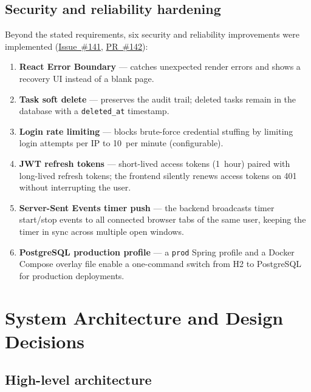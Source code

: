 \documentclass[a4paper, 12pt]{article}
\begin{document}
\subsection{Security and reliability hardening}
\label{sec:hardening-overview}

Beyond the stated requirements, six security and reliability improvements were implemented
(\href{https://github.com/se2p-classrooms/final-project-AliAkbarBaloch/issues/141}{Issue~\#141},
\href{https://github.com/se2p-classrooms/final-project-AliAkbarBaloch/pull/142}{PR~\#142}):

\begin{enumerate}
  \item \textbf{React Error Boundary} --- catches unexpected render errors and shows a recovery
        UI instead of a blank page.
  \item \textbf{Task soft delete} --- preserves the audit trail; deleted tasks remain in the
        database with a \texttt{deleted\_at} timestamp.
  \item \textbf{Login rate limiting} --- blocks brute-force credential stuffing by limiting
        login attempts per IP to 10~per minute (configurable).
  \item \textbf{JWT refresh tokens} --- short-lived access tokens (1~hour) paired with
        long-lived refresh tokens; the frontend silently renews access tokens on 401 without
        interrupting the user.
  \item \textbf{Server-Sent Events timer push} --- the backend broadcasts timer start/stop
        events to all connected browser tabs of the same user, keeping the timer in sync
        across multiple open windows.
  \item \textbf{PostgreSQL production profile} --- a \texttt{prod} Spring profile and a
        Docker Compose overlay file enable a one-command switch from H2 to
        PostgreSQL for production deployments.
\end{enumerate}

\section{System Architecture and Design Decisions}
\label{sec:architecture}

\subsection{High-level architecture}
\end{document}
